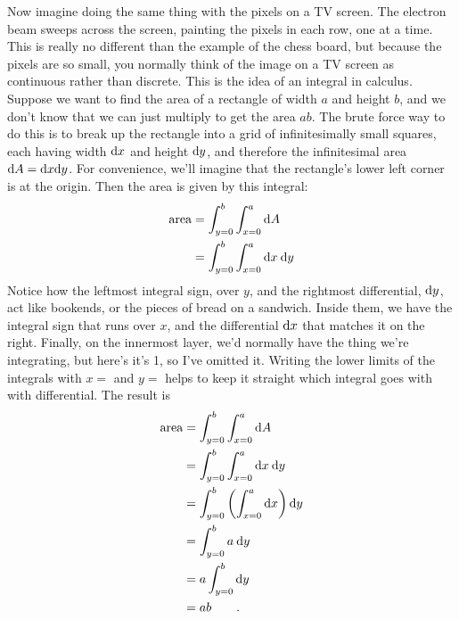 Now imagine doing the same thing with the pixels on a TV screen. The electron
beam sweeps across the screen, painting the pixels in each row, one at a time.
This is really no different than the example of the chess board, but because the
pixels are so small, you normally think of the image on a TV screen as continuous
rather than discrete.
This is the idea of an integral in calculus.
Suppose we want to find the area of a rectangle of width
$a$ and height $b$, and we don't know that we can just multiply to get the
area $ab$. The brute force way to do this is to break up the rectangle into
a grid of infinitesimally small squares, each having width $\textup{d} x$ and
height $\textup{d} y$, and therefore the infinitesimal area $\textup{d} A = \textup{d} x \textup{d} y$.
For convenience, we'll imagine that the rectangle's
lower left corner is at the origin. Then the area is given by this integral:
\begin{align*}
  \text{area} &= \int_{y=0}^b \int_{x=0}^a \textup{d} A \\
              &= \int_{y=0}^b \int_{x=0}^a \textup{d} x \:\textup{d} y 
\end{align*}
Notice how the leftmost integral sign, over $y$, and the rightmost differential, $\textup{d} y$,
act like bookends, or the pieces of bread on a sandwich. Inside them, we have
the integral sign that runs over $x$, and the differential $\textup{d} x$ that matches
it on the right. Finally, on the innermost layer, we'd normally
have the thing we're integrating, but here's it's 1, so I've omitted it. Writing the
lower limits of the integrals with $x=$ and $y=$ helps to keep it straight which
integral goes with with differential. The result is
\begin{align*}
  \text{area} &= \int_{y=0}^b \int_{x=0}^a \textup{d} A \\
              &= \int_{y=0}^b \int_{x=0}^a \textup{d} x \:\textup{d} y \\
              &= \int_{y=0}^b \left(\int_{x=0}^a \textup{d} x\right) \textup{d} y \\
              &= \int_{y=0}^b a \:\textup{d} y \\
              &= a \int_{y=0}^b \textup{d} y \\
              &= ab \qquad .
\end{align*}

